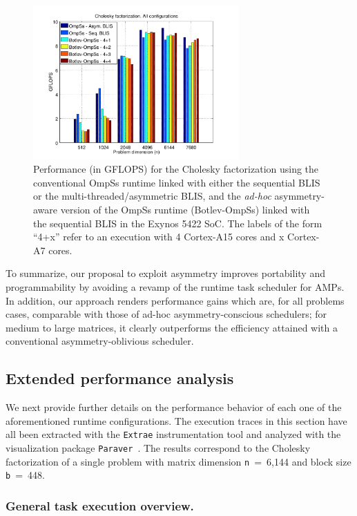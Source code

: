 \begin{figure}
\centering
\includegraphics[width=0.70\textwidth]{Plots/Comparative/comparative}
\caption{Performance (in GFLOPS) for the Cholesky factorization using
         the conventional OmpSs runtime linked with 
         either the sequential BLIS or the multi-threaded/asymmetric BLIS, and the {\em ad-hoc} asymmetry-aware version of the
         OmpSs runtime (Botlev-OmpSs) linked with the sequential BLIS in 
         the Exynos 5422 SoC. The labels of the form ``4+x'' refer to an execution with 4 Cortex-A15 cores and x Cortex-A7 cores.}
\label{fig:comparative}
\end{figure}

To summarize, our proposal to exploit asymmetry improves portability and programmability by avoiding
a revamp of the runtime task scheduler for AMPs. In addition, our approach renders performance
gains which are, for all problems cases, comparable with those of ad-hoc asymmetry-conscious schedulers; 
for medium to large matrices, it clearly outperforms the efficiency attained with a conventional 
asymmetry-oblivious scheduler.

\subsection{Extended performance analysis}

We next provide further details on the performance behavior of each one of the aforementioned runtime configurations.
The execution traces in this section have all been extracted with the {\tt Extrae} instrumentation
tool and analyzed with the visualization package {\tt Paraver}~\cite{Paraver}. 
The results correspond to the Cholesky factorization of a single problem with matrix dimension {\tt n}~=~6,144 and 
block size {\tt b}~=~448.

\subsubsection{General task execution overview.}


